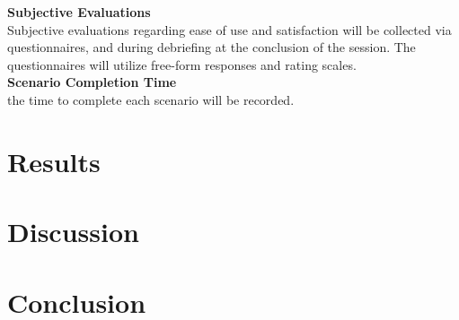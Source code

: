 \documentclass[10pt]{article}
\begin{document}
\begin{multicols}{2}
\textbf{Subjective Evaluations}\\
Subjective evaluations regarding ease of use and satisfaction will be collected via questionnaires, and during debriefing at the conclusion of the session. The questionnaires will utilize free-form responses and rating scales.\\

\textbf{Scenario Completion Time}\\
the time to complete each scenario  will be recorded.\\


\section*{Results}
\section*{Discussion}
\section*{Conclusion}
\end{multicols}
\end{document}
